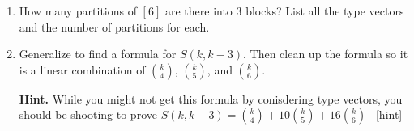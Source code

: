\documentclass{book}
\begin{document}
\setcounter{project}{275}
\addtocounter{project}{-1}
\begin{activity}[]\label{activity-268}
\leavevmode%
\begin{enumerate}[font=\bfseries,label=(\alph*),ref=\alph*]
\item\label{task-262} \hypertarget{p-1438}{}%
How many partitions of \([6]\) are there into 3 blocks?  List all the type vectors and the number of partitions for each.%
\item\label{task-263} \hypertarget{p-1439}{}%
Generalize to find a formula for \(S(k,k-3)\).  Then clean up the formula so it is a linear combination of \(\binom{k}{4}\), \(\binom{k}{5}\), and \(\binom{k}{6}\).%
\par\smallskip%
\noindent\textbf{Hint.}\hypertarget{hint-179}{}\quad%
\hypertarget{p-1440}{}%
While you might not get this formula by conisdering type vectors, you should be shooting to prove \(S(k, k-3) = \binom{k}{4} + 10 \binom{k}{5} + 16 \binom{k}{6}\)%
~\hfill{\tiny\hyperlink{a-275.b}{[hint]}\hypertarget{q-275.b}{}}\end{enumerate}
\end{activity}
\end{document}
